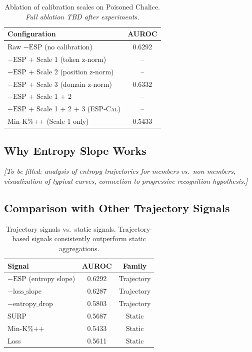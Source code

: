 \documentclass[11pt]{article}
\newcommand{\ours}{\textsc{ESP-Cal}}
\newcommand{\esp}{\text{ESP}}
\begin{document}
\begin{table}[t]
\centering
\small
\begin{tabular}{@{}lc@{}}
\toprule
\textbf{Configuration} & \textbf{AUROC} \\
\midrule
Raw $-\esp$ (no calibration) & 0.6292 \\
$-\esp$ + Scale 1 (token z-norm) & -- \\
$-\esp$ + Scale 2 (position z-norm) & -- \\
$-\esp$ + Scale 3 (domain z-norm) & 0.6332 \\
$-\esp$ + Scale 1 + 2 & -- \\
$-\esp$ + Scale 1 + 2 + 3  (\ours{}) & -- \\
\midrule
Min-K\%++ (Scale 1 only) & 0.5433 \\
\bottomrule
\end{tabular}
\caption{Ablation of calibration scales on Poisoned Chalice. \textit{Full ablation TBD after experiments.}}
\label{tab:ablation_scales}
\end{table}

\subsection{Why Entropy Slope Works}

\textit{[To be filled: analysis of entropy trajectories for members vs.\ non-members, visualization of typical curves, connection to progressive recognition hypothesis.]}

\subsection{Comparison with Other Trajectory Signals}

\begin{table}[t]
\centering
\small
\begin{tabular}{@{}lcc@{}}
\toprule
\textbf{Signal} & \textbf{AUROC} & \textbf{Family} \\
\midrule
$-\esp$ (entropy slope) & 0.6292 & Trajectory \\
$-\text{loss\_slope}$ & 0.6287 & Trajectory \\
$-\text{entropy\_drop}$ & 0.5803 & Trajectory \\
SURP & 0.5687 & Static \\
Min-K\%++ & 0.5433 & Static \\
Loss & 0.5611 & Static \\
\bottomrule
\end{tabular}
\caption{Trajectory signals vs.\ static signals. Trajectory-based signals consistently outperform static aggregations.}
\label{tab:trajectory_vs_static}
\end{table}
\end{document}
